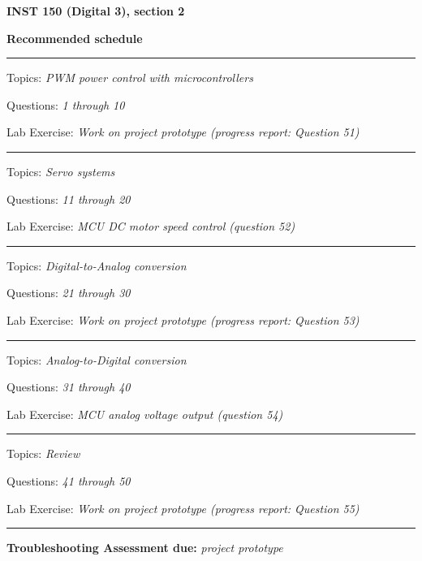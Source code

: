 
\centerline{\bf INST 150 (Digital 3), section 2} \bigskip 
 
\vskip 10pt

\noindent
{\bf Recommended schedule}

\vskip 5pt

\hrule \vskip 5pt
\noindent
{}

\hskip 10pt Topics: {\it PWM power control with microcontrollers}
 
\hskip 10pt Questions: {\it 1 through 10}
 
\hskip 10pt Lab Exercise: {\it Work on project prototype (progress report: Question 51)}
 
\vskip 10pt
\hrule \vskip 5pt
\noindent
{}

\hskip 10pt Topics: {\it Servo systems}
 
\hskip 10pt Questions: {\it 11 through 20}
 
\hskip 10pt Lab Exercise: {\it MCU DC motor speed control (question 52)}
 
\vskip 10pt
\hrule \vskip 5pt
\noindent
{}

\hskip 10pt Topics: {\it Digital-to-Analog conversion}
 
\hskip 10pt Questions: {\it 21 through 30}
 
\hskip 10pt Lab Exercise: {\it Work on project prototype (progress report: Question 53)}
 
\vskip 10pt
\hrule \vskip 5pt
\noindent
{}

\hskip 10pt Topics: {\it Analog-to-Digital conversion}
 
\hskip 10pt Questions: {\it 31 through 40}
 
\hskip 10pt Lab Exercise: {\it MCU analog voltage output (question 54)}
 
\vskip 10pt
\hrule \vskip 5pt
\noindent
{}

\hskip 10pt Topics: {\it Review}
 
\hskip 10pt Questions: {\it 41 through 50}
 
\hskip 10pt Lab Exercise: {\it Work on project prototype (progress report: Question 55)}
 

\vskip 10pt
\hrule \vskip 5pt
\noindent
{}

\hskip 10pt {\bf Troubleshooting Assessment due:} {\it project prototype}

